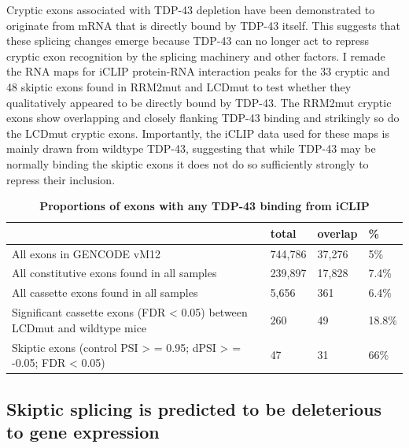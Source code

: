 Cryptic exons associated with TDP-43 depletion have been demonstrated to originate from mRNA that is directly bound by TDP-43 itself. 
This suggests that these splicing changes emerge because TDP-43 can no longer act to repress cryptic exon recognition by the splicing machinery and other factors. 
I remade the RNA maps for iCLIP protein-RNA interaction peaks for the 33 cryptic and 48 skiptic exons found in RRM2mut and LCDmut to test whether they qualitatively appeared to be directly bound by TDP-43. 
The RRM2mut cryptic exons show overlapping and closely flanking TDP-43 binding and strikingly so do the LCDmut cryptic exons. Importantly, the iCLIP data used for these maps is mainly drawn from wildtype TDP-43, suggesting that while TDP-43 may be normally binding the skiptic exons it does not do so sufficiently strongly to repress their inclusion. 



\begin{table}
	\begin{footnotesize}
	\begin{tabular}{llll}
		& total &	overlap	& \% \\
		\hline
		All exons in GENCODE vM12 &	744,786	& 37,276 & 5\% \\
		All constitutive exons found in all samples	& 239,897	& 17,828	& 7.4\% \\
		All cassette exons found in all samples &	5,656 &	361	& 6.4\% \\
		Significant cassette exons (FDR < 0.05) between LCDmut and wildtype mice	& 260	& 49 & 18.8\% \\
		Skiptic exons (control PSI > = 0.95; dPSI > = -0.05; FDR < 0.05) & 47 &	31 & 66\% \\
	\end{tabular}
	\end{footnotesize}
	\caption{\textbf{Proportions of exons with any TDP-43 binding from iCLIP}}
	\label{tab:iclip_proportions}
\end{table}


\subsection{Skiptic splicing is predicted to be deleterious to gene expression}

